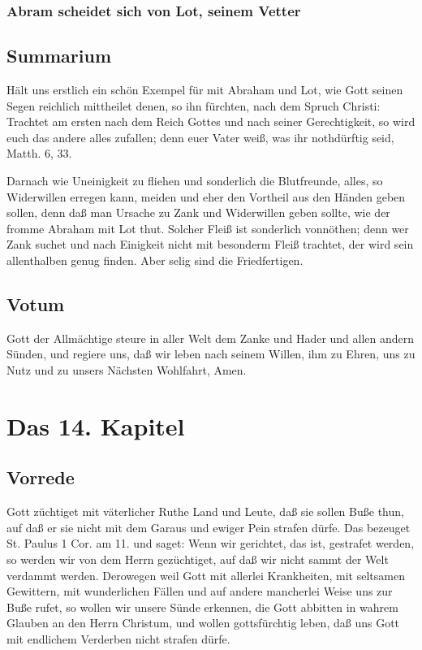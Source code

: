 \subsection{Abram scheidet sich von Lot, seinem Vetter}

\section{Summarium}

Hält uns erstlich ein schön Exempel für mit Abraham und Lot, wie Gott seinen Segen reichlich mittheilet denen, so ihn fürchten, nach dem Spruch Christi: Trachtet am ersten nach dem Reich Gottes und nach seiner Gerechtigkeit, so wird euch das andere alles zufallen; denn euer Vater weiß, was ihr nothdürftig seid, Matth. 6, 33.

Darnach wie Uneinigkeit zu fliehen und sonderlich die Blutfreunde, alles, so Widerwillen erregen kann, meiden und eher den Vortheil aus den Händen geben sollen, denn daß man Ursache zu Zank und Widerwillen geben sollte, wie der fromme Abraham mit Lot thut. Solcher Fleiß ist sonderlich vonnöthen; denn wer Zank suchet und nach Einigkeit nicht mit besonderm Fleiß trachtet, der wird sein allenthalben genug finden. Aber selig sind die Friedfertigen.

\section{Votum}

Gott der Allmächtige steure in aller Welt dem Zanke und Hader und allen andern Sünden, und regiere uns, daß wir leben nach seinem Willen, ihm zu Ehren, uns zu Nutz und zu unsers Nächsten Wohlfahrt, Amen.

\chapter{Das 14. Kapitel}

\section{Vorrede}

Gott züchtiget mit väterlicher Ruthe Land und Leute, daß sie sollen Buße thun, auf daß er sie nicht mit dem Garaus und ewiger Pein strafen dürfe. Das bezeuget St. Paulus 1 Cor. am 11. und saget: Wenn wir gerichtet, das ist, gestrafet werden, so werden wir von dem Herrn gezüchtiget, auf daß wir nicht sammt der Welt verdammt werden. Derowegen weil Gott mit allerlei Krankheiten, mit seltsamen Gewittern, mit wunderlichen Fällen und auf andere mancherlei Weise uns zur Buße rufet, so wollen wir unsere Sünde erkennen, die Gott abbitten in wahrem Glauben an den Herrn Christum, und wollen gottsfürchtig leben, daß uns Gott mit endlichem Verderben nicht strafen dürfe.

